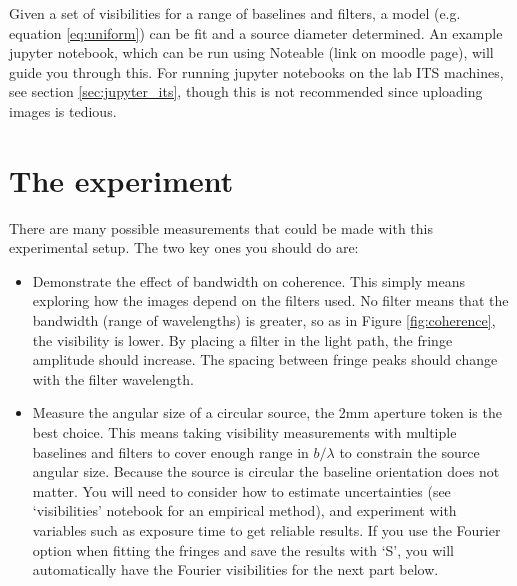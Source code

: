 \documentclass[11pt]{article}
\begin{document}
Given a set of visibilities for a range of baselines and filters, a model (e.g. equation \ref{eq:uniform}) can be fit and a source diameter determined. An example jupyter notebook, which can be run using Noteable (link on moodle page), will guide you through this. For running jupyter notebooks on the lab ITS machines, see section \ref{sec:jupyter_its}, though this is not recommended since uploading images is tedious.

\clearpage

\section{The experiment}\label{sec:exp}

There are many possible measurements that could be made with this experimental setup. The two key ones you should do are:
\begin{itemize}
    \item Demonstrate the effect of bandwidth on coherence. This simply means exploring how the images depend on the filters used. No filter means that the bandwidth (range of wavelengths) is greater, so as in Figure \ref{fig:coherence}, the visibility is lower. By placing a filter in the light path, the fringe amplitude should increase. The spacing between fringe peaks should change with the filter wavelength.
    \item Measure the angular size of a circular source, the 2mm aperture token is the best choice. This means taking visibility measurements with multiple baselines and filters to cover enough range in $b/\lambda$ to constrain the source angular size. Because the source is circular the baseline orientation does not matter. You will need to consider how to estimate uncertainties (see `visibilities' notebook for an empirical method), and experiment with variables such as exposure time to get reliable results. If you use the Fourier option when fitting the fringes and save the results with `S', you will automatically have the Fourier visibilities for the next part below.
\end{itemize}
\end{document}
